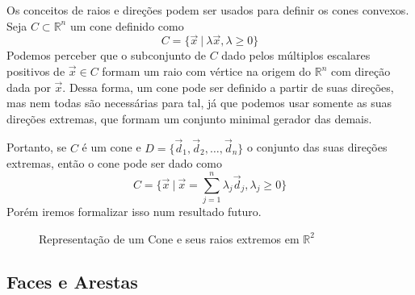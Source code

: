 Os conceitos de raios e direções podem ser usados para definir os cones convexos. Seja $C \subset \mathbb{R}^n$ um cone definido como \[C = \{\vec{x}\ |\ \lambda\vec{x}, \lambda \geq 0\}\]Podemos perceber que o subconjunto de $C$ dado pelos múltiplos escalares positivos de $\vec{x} \in C$ formam um raio com vértice na origem do $\mathbb{R}^n$ com direção dada por $\vec{x}$. Dessa forma, um cone pode ser definido a partir de suas direções, mas nem todas são necessárias para tal, já que podemos usar somente as suas direções extremas, que formam um conjunto minimal gerador das demais.

Portanto, se $C$ é um cone e $D = \{\vec{d}_1, \vec{d}_2, \ldots, \vec{d}_n\}$ o conjunto das suas direções extremas, então o cone pode ser dado como
\begin{equation*}
	C = \{\vec{x}\ |\ \vec{x} = \displaystyle\sum_{j = 1}^{n}
			\lambda_j \vec{d}_j, \lambda_j \geq 0\}
\end{equation*}
Porém iremos formalizar isso num resultado futuro.
\begin{figure}[H]
\centering
{}
\caption{Representação de um Cone e seus raios extremos em \(\mathbb{R}^2\)}

\label{fig:cone}
\end{figure}

\subsection{Faces e Arestas}

